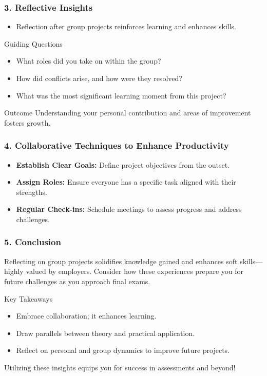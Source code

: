 \documentclass[aspectratio=169]{beamer}
\begin{document}
\begin{frame}[fragile]
  \frametitle{3. Reflective Insights}
  \begin{itemize}
    \item Reflection after group projects reinforces learning and enhances skills.
  \end{itemize}
  
  \begin{block}{Guiding Questions}
    \begin{itemize}
      \item What roles did you take on within the group?
      \item How did conflicts arise, and how were they resolved?
      \item What was the most significant learning moment from this project?
    \end{itemize}
  \end{block}

  \begin{block}{Outcome}
    Understanding your personal contribution and areas of improvement fosters growth.
  \end{block}
\end{frame}

\begin{frame}[fragile]
  \frametitle{4. Collaborative Techniques to Enhance Productivity}
  \begin{itemize}
    \item \textbf{Establish Clear Goals:} Define project objectives from the outset.
    \item \textbf{Assign Roles:} Ensure everyone has a specific task aligned with their strengths.
    \item \textbf{Regular Check-ins:} Schedule meetings to assess progress and address challenges.
  \end{itemize}
\end{frame}

\begin{frame}[fragile]
  \frametitle{5. Conclusion}
  Reflecting on group projects solidifies knowledge gained and enhances soft skills—highly valued by employers. Consider how these experiences prepare you for future challenges as you approach final exams.

  \begin{block}{Key Takeaways}
    \begin{itemize}
      \item Embrace collaboration; it enhances learning.
      \item Draw parallels between theory and practical application.
      \item Reflect on personal and group dynamics to improve future projects.
    \end{itemize}
    Utilizing these insights equips you for success in assessments and beyond!
  \end{block}
\end{frame}
\end{document}
